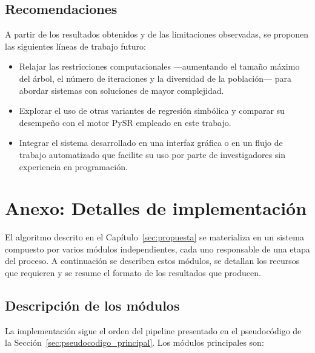 \documentclass[12pt,a4paper]{article} \usepackage[utf8]{inputenc} \usepackage[spanish]{babel} \usepackage{amsmath, amssymb, amsthm} \usepackage{bm} \usepackage{float} \usepackage{longtable} \usepackage[hidelinks]{hyperref}
\begin{document}
\newpage
\subsection*{Recomendaciones}

A partir de los resultados obtenidos y de las limitaciones observadas, se proponen las siguientes líneas de trabajo futuro:

\begin{itemize}
\item Relajar las restricciones computacionales —aumentando el tamaño máximo del árbol, el número de iteraciones y la diversidad de la población— para abordar sistemas con soluciones de mayor complejidad.

\item Explorar el uso de otras variantes de regresión simbólica y comparar su desempeño con el motor PySR empleado en este trabajo.

\item Integrar el sistema desarrollado en una interfaz gráfica o en un flujo de trabajo automatizado que facilite su uso por parte de investigadores sin experiencia en programación.
\end{itemize}

\newpage

\section*{Anexo: Detalles de implementación}
\label{sec:anexo_implementacion}

El algoritmo descrito en el Capítulo~\ref{sec:propuesta} se materializa en un
sistema compuesto por varios módulos independientes, cada uno responsable
de una etapa del proceso. A continuación se describen estos módulos, se
detallan los recursos que requieren y se resume el formato de los
resultados que producen.

\subsection{Descripción de los módulos}
\label{sec:modulos_anexo}

La implementación sigue el orden del pipeline presentado en el pseudocódigo
de la Sección~\ref{sec:pseudocodigo_principal}. Los módulos principales son:
\end{document}
